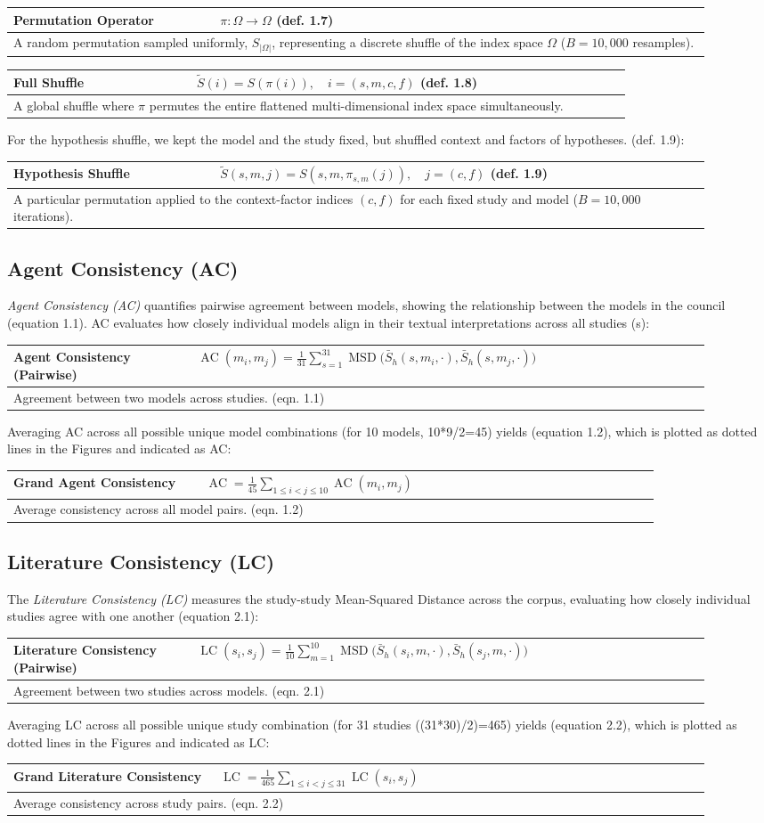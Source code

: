 \documentclass[12pt]{article}
\renewcommand{\arraystretch}{1.06}
\newcommand{\EquationBox}[3]{%
  \begin{center}
  \begingroup
  \small
  \setlength{\tabcolsep}{6pt}%
  \renewcommand{\arraystretch}{1.18}%
  \begin{tabular}{|p{0.27\linewidth}|p{0.64\linewidth}|}
  \hline
  \textbf{#1} & #2 \\
  \hline
  \multicolumn{2}{|p{0.94\linewidth}|}{#3} \\
  \hline
  \end{tabular}
  \endgroup
  \end{center}
}
\newcommand{\EquationBoxWideLeft}[3]{%
  \begin{center}
  \begingroup
  \small
  \setlength{\tabcolsep}{6pt}%
  \renewcommand{\arraystretch}{1.18}%
  \begin{tabular}{|p{0.24\linewidth}|p{0.67\linewidth}|}
  \hline
  \textbf{#1} & #2 \\
  \hline
  \multicolumn{2}{|p{0.94\linewidth}|}{#3} \\
  \hline
  \end{tabular}
  \endgroup
  \end{center}
}
\begin{document}
\EquationBox{Permutation Operator}{\(\pi:\Omega\to\Omega\) (def. 1.7)}{A random permutation sampled uniformly, \(S_{|\Omega|}\), representing a discrete shuffle of the index space \(\Omega\) ($B=10{,}000$ resamples).}
\EquationBox{Full Shuffle}{\(\tilde{S}(i)=S(\pi(i)),\quad i=(s,m,c,f)\) (def. 1.8)}{A global shuffle where \(\pi\) permutes the entire flattened multi-dimensional index space simultaneously.}
For the hypothesis shuffle, we kept the model and the study fixed, but shuffled context and factors of hypotheses. (def. 1.9):
\EquationBox{Hypothesis Shuffle}{\(\tilde{S}(s,m,j)=S(s,m,\pi_{s,m}(j)),\quad j=(c,f)\) (def. 1.9)}{A particular permutation applied to the context-factor indices \((c,f)\) for each fixed study and model ($B=10{,}000$ iterations).}
\subsection{Agent Consistency (AC)}\label{agent-consistency-ac}

\emph{Agent Consistency (AC)} quantifies pairwise agreement between models, showing the relationship between the models in the council (equation 1.1). AC evaluates how closely individual models align in their textual interpretations across all studies (s):
\EquationBoxWideLeft{Agent Consistency (Pairwise)}{\(\displaystyle \operatorname{AC}(m_i,m_j)=\frac{1}{31}\sum_{s=1}^{31}\operatorname{MSD}\bigl(\bar{S}_h(s,m_i,\cdot),\bar{S}_h(s,m_j,\cdot)\bigr)\)}{Agreement between two models across studies. (eqn. 1.1)}
Averaging AC across all possible unique model combinations (for 10 models, 10*9/2=45) yields (equation 1.2), which is plotted as dotted lines in the Figures and indicated as AC:
\EquationBox{Grand Agent Consistency}{\(\displaystyle \operatorname{AC}=\frac{1}{45}\sum_{1\le i<j\le 10}\operatorname{AC}(m_i,m_j)\)}{Average consistency across all model pairs. (eqn. 1.2)}
\subsection{Literature Consistency (LC)}\label{literature-consistency-lc}

The \emph{Literature Consistency (LC)} measures the study-study Mean-Squared Distance across the corpus, evaluating how closely individual studies agree with one another (equation 2.1):
\EquationBoxWideLeft{Literature Consistency (Pairwise)}{\(\displaystyle \operatorname{LC}(s_i,s_j)=\frac{1}{10}\sum_{m=1}^{10}\operatorname{MSD}\bigl(\bar{S}_h(s_i,m,\cdot),\bar{S}_h(s_j,m,\cdot)\bigr)\)}{Agreement between two studies across models. (eqn. 2.1)}
Averaging LC across all possible unique study combination (for 31 studies ((31*30)/2)=465) yields (equation 2.2), which is plotted as dotted lines in the Figures and indicated as LC:
\EquationBox{Grand Literature Consistency}{\(\displaystyle \operatorname{LC}=\frac{1}{465}\sum_{1\le i<j\le 31}\operatorname{LC}(s_i,s_j)\)}{Average consistency across study pairs. (eqn. 2.2)}
\end{document}
